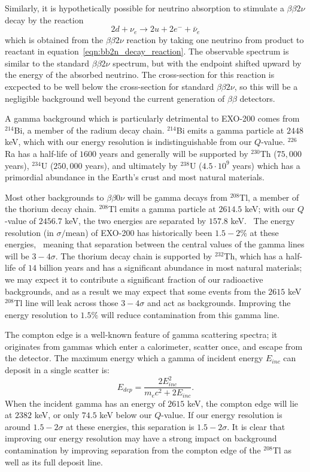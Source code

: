 Similarly, it is hypothetically possible for neutrino absorption to stimulate a $\beta\beta 2\nu$ decay by the reaction
\begin{equation}
2d + \nu_e \rightarrow 2u + 2e^- + \bar{\nu}_e
\end{equation}
which is obtained from the $\beta\beta 2\nu$ reaction by taking one neutrino from product to reactant in equation~\ref{eqn:bb2n_decay_reaction}.  The observable spectrum is similar to the standard $\beta\beta 2\nu$ spectrum, but with the endpoint shifted upward by the energy of the absorbed neutrino.  The cross-section for this reaction is excpected to be well below the cross-section for standard $\beta\beta 2\nu$, so this will be a negligible background well beyond the current generation of $\beta\beta$ detectors.

A gamma background which is particularly detrimental to EXO-200 comes from $^{214}$Bi, a member of the radium decay chain.  $^{214}$Bi emits a gamma particle at $2448$ keV, which with our energy resolution is indistinguishable from our $Q$-value.   $^{226}$Ra has a half-life of $1600$ years and generally will be supported by $^{230}$Th ($75,000$ years), $^{234}$U ($250,000$ years), and ultimately by $^{238}$U ($4.5 \cdot 10^9$ years) which has a primordial abundance in the Earth's crust and most natural materials.~\cite{ENSDF}

Most other backgrounds to $\beta\beta 0\nu$ will be gamma decays from $^{208}$Tl, a member of the thorium decay chain.  $^{208}$Tl emits a gamma particle at $2614.5$ keV; with our $Q$-value of $2456.7$ keV, the two energies are separated by $157.8$ keV.~\cite{ENSDF}  The energy resolution (in $\sigma/\text{mean}$) of EXO-200 has historically been $1.5-2\%$ at these energies,~\cite{NewEXObb0nPaper_2014} meaning that separation between the central values of the gamma lines will be $3-4\sigma$.  The thorium decay chain is supported by $^{232}$Th, which has a half-life of $14$ billion years and has a significant abundance in most natural materials; we may expect it to contribute a significant fraction of our radioactive backgrounds, and as a result we may expect that some events from the $2615$ keV $^{208}$Tl line will leak across those $3-4\sigma$ and act as backgrounds.  Improving the energy resolution to $1.5\%$ will reduce contamination from this gamma line.

The compton edge is a well-known feature of gamma scattering spectra; it originates from gammas which enter a calorimeter, scatter once, and escape from the detector.  The maximum energy which a gamma of incident energy $E_{inc}$ can deposit in a single scatter is:~\cite{Compton}
\begin{equation}
E_{dep} = \frac{2E_{inc}^2}{m_e c^2 + 2E_{inc}}.
\end{equation}
When the incident gamma has an energy of $2615$ keV, the compton edge will lie at $2382$ keV, or only $74.5$ keV below our $Q$-value.  If our energy resolution is around $1.5-2\sigma$ at these energies, this separation is $1.5-2\sigma$.  It is clear that improving our energy resolution may have a strong impact on background contamination by improving separation from the compton edge of the $^{208}$Tl as well as its full deposit line.

